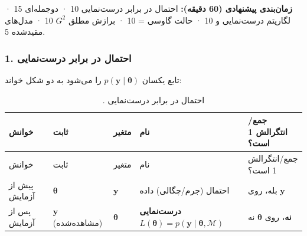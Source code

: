 \textbf{زمان‌بندی پیشنهادی (60 دقیقه):} احتمال در برابر درست‌نمایی 10 ·
 دوجمله‌ای 15 · لگاریتم درست‌نمایی و  10 · حالت گاوسی
 =  10 · برازش مطلق \(G^2\) 10 · مدل‌های مقیدشده 5.

\subsubsection{1. احتمال در برابر درست‌نمایی}

تابع یکسان \(p(\mathbf{y}\mid\boldsymbol\theta)\) را می‌شود به دو شکل
خواند:

\begin{longtable}[]{@{}
  >{\raggedright\arraybackslash}p{}
  >{\raggedright\arraybackslash}p{}
  >{\raggedright\arraybackslash}p{}
  >{\raggedright\arraybackslash}p{}
  >{\raggedright\arraybackslash}p{}@{}}
\caption{. احتمال در برابر درست‌نمایی}\tabularnewline
\toprule\noalign{}
\begin{minipage}[b]{\linewidth}\raggedright
خوانش
\end{minipage} & \begin{minipage}[b]{\linewidth}\raggedright
ثابت
\end{minipage} & \begin{minipage}[b]{\linewidth}\raggedright
متغیر
\end{minipage} & \begin{minipage}[b]{\linewidth}\raggedright
نام
\end{minipage} & \begin{minipage}[b]{\linewidth}\raggedright
جمع/انتگرالش 1 است؟
\end{minipage} \\
\midrule\noalign{}
\endfirsthead
\toprule\noalign{}
\begin{minipage}[b]{\linewidth}\raggedright
خوانش
\end{minipage} & \begin{minipage}[b]{\linewidth}\raggedright
ثابت
\end{minipage} & \begin{minipage}[b]{\linewidth}\raggedright
متغیر
\end{minipage} & \begin{minipage}[b]{\linewidth}\raggedright
نام
\end{minipage} & \begin{minipage}[b]{\linewidth}\raggedright
جمع/انتگرالش 1 است؟
\end{minipage} \\
\midrule\noalign{}
\endhead
\bottomrule\noalign{}
\endlastfoot
پیش از آزمایش & \(\boldsymbol\theta\) & \(\mathbf{y}\) & احتمال
(جرم/چگالی) داده & بله، روی \(\mathbf{y}\) \\
پس از آزمایش & \(\mathbf{y}\) (مشاهده‌شده) & \(\boldsymbol\theta\) &
\textbf{درست‌نمایی}
\(L(\boldsymbol\theta) = p(\mathbf{y}\mid\boldsymbol\theta,\mathcal{M})\)
& \textbf{نه}، روی \(\boldsymbol\theta\) نه \\
\end{longtable}

